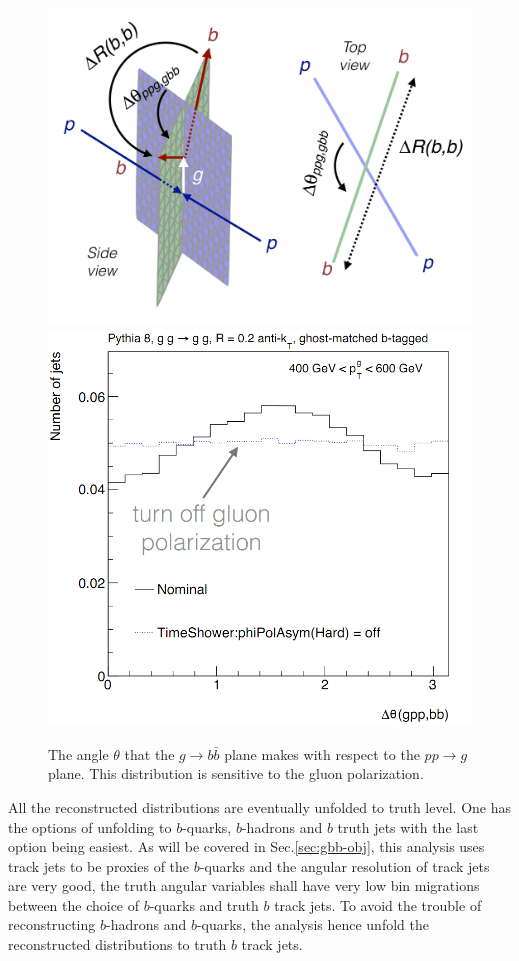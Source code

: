 
\begin{figure}[htpb!]
\begin{center}
\includegraphics[width=0.45\linewidth]{figures/gbb/schematic.pdf}
\includegraphics[width=0.45\linewidth]{figures/gbb/dtheta.png}
\caption{The angle $\theta$ that the $g\rightarrow b\bar{b}$ plane makes with respect to the $pp\rightarrow g$ plane. This distribution is sensitive to the gluon polarization.} 
\label{fig:gbb-gbbangle}
\end{center}
\end{figure}


All the reconstructed distributions are eventually unfolded to truth level. One has the options of unfolding to $b$-quarks, $b$-hadrons and $b$ truth jets with the last option being easiest. As will be covered in Sec.\ref{sec:gbb-obj}, this analysis uses track jets to be proxies of the $b$-quarks and the angular resolution of track jets are very good, the truth angular variables shall have very low bin migrations between the choice of $b$-quarks and truth $b$ track jets. To avoid the trouble of reconstructing $b$-hadrons and $b$-quarks, the analysis hence unfold the reconstructed distributions to truth $b$ track jets. 
